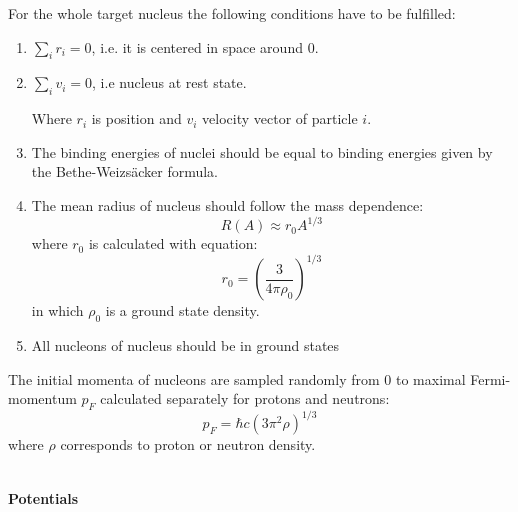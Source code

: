 For the whole target nucleus the following conditions have to be fulfilled:

\begin{enumerate}
	\item $\sum_{i}r_i=0$, i.e. it is centered in space around 0.
	\item $\sum_{i}v_i=0$, i.e nucleus at rest state.
	
	Where $r_i$ is position and $v_i$ velocity vector of particle $i$.
	
	\item The binding energies of nuclei should be equal to binding 
	energies given by the Bethe-Weizs\"{a}cker formula.
	\item The mean radius of nucleus should follow the 
	mass dependence:
	\begin{equation}
		R(A)\approx r_0 A^{1/3}
	\end{equation}
where $r_0$ is calculated with equation:
\begin{equation}
	r_0 = \left(\frac{3}{4\pi\rho_{0}}\right)^{1/3}
\end{equation}
in which $\rho_0$ is a ground state density.

\item All nucleons of nucleus should be in ground states 
 
\end{enumerate} 

The initial momenta of nucleons are sampled randomly from 0 to maximal Fermi-momentum $p_F$ calculated separately for protons and neutrons: 
\begin{equation}
	p_F=\hbar c\left(3\pi^2\rho\right)^{1/3}
\end{equation}
where $\rho$ corresponds to proton or neutron density.\par

 \ \\
\textbf{Potentials}

